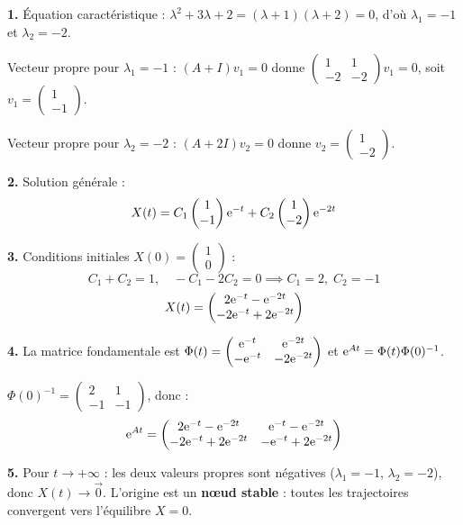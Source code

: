\documentclass[12pt,a4paper]{article}
\begin{document}
\begin{boitecorrige}
\textbf{1.} Équation caractéristique : $\lambda^2+3\lambda+2 = (\lambda+1)(\lambda+2) = 0$, d'où $\lambda_1=-1$ et $\lambda_2=-2$.

Vecteur propre pour $\lambda_1=-1$ : $(A+I)v_1 = 0$ donne $\begin{pmatrix}1&1\\-2&-2\end{pmatrix}v_1=0$, soit $v_1 = \begin{pmatrix}1\\-1\end{pmatrix}$.

Vecteur propre pour $\lambda_2=-2$ : $(A+2I)v_2 = 0$ donne $v_2 = \begin{pmatrix}1\\-2\end{pmatrix}$.

\textbf{2.} Solution générale :
\[
X(t) = C_1\begin{pmatrix}1\\-1\end{pmatrix}\mathrm{e}^{-t} + C_2\begin{pmatrix}1\\-2\end{pmatrix}\mathrm{e}^{-2t}
\]

\textbf{3.} Conditions initiales $X(0) = \begin{pmatrix}1\\0\end{pmatrix}$ :
\[
C_1+C_2 = 1, \quad -C_1-2C_2 = 0 \implies C_1 = 2,\; C_2 = -1
\]
\[
X(t) = \begin{pmatrix}2\mathrm{e}^{-t}-\mathrm{e}^{-2t}\\-2\mathrm{e}^{-t}+2\mathrm{e}^{-2t}\end{pmatrix}
\]

\textbf{4.} La matrice fondamentale est $\Phi(t) = \begin{pmatrix}\mathrm{e}^{-t}&\mathrm{e}^{-2t}\\-\mathrm{e}^{-t}&-2\mathrm{e}^{-2t}\end{pmatrix}$ et $\mathrm{e}^{At} = \Phi(t)\Phi(0)^{-1}$.

$\Phi(0)^{-1} = \begin{pmatrix}2&1\\-1&-1\end{pmatrix}$, donc :
\[
\mathrm{e}^{At} = \begin{pmatrix}2\mathrm{e}^{-t}-\mathrm{e}^{-2t} & \mathrm{e}^{-t}-\mathrm{e}^{-2t}\\-2\mathrm{e}^{-t}+2\mathrm{e}^{-2t} & -\mathrm{e}^{-t}+2\mathrm{e}^{-2t}\end{pmatrix}
\]

\textbf{5.} Pour $t\to+\infty$ : les deux valeurs propres sont négatives ($\lambda_1=-1$, $\lambda_2=-2$), donc $X(t)\to\vec{0}$. L'origine est un \textbf{n\oe{}ud stable} : toutes les trajectoires convergent vers l'équilibre $X=0$.
\end{boitecorrige}
\end{document}
